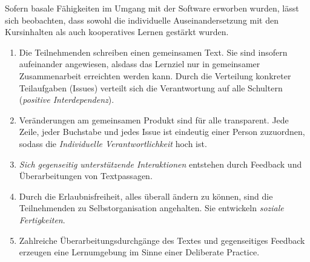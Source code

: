 \documentclass
	[
		11pt,
		a4paper,
		oneside,
		ngerman
	]
	{article}
\begin{document}
Sofern basale Fähigkeiten im Umgang mit der Software erworben wurden, lässt sich beobachten, dass sowohl die individuelle Auseinandersetzung mit den Kursinhalten als auch kooperatives Lernen \citep[vgl.][]{johnson-1999} gestärkt wurden.

\begin{enumerate}

	\item Die Teilnehmenden schreiben einen gemeinsamen Text.
	Sie sind insofern aufeinander angewiesen, alsdass das Lernziel nur in gemeinsamer Zusammenarbeit erreichten werden kann.
	Durch die Verteilung konkreter Teilaufgaben (Issues) verteilt sich die Verantwortung auf alle Schultern (\emph{positive Interdependenz}).
	\item Veränderungen am gemeinsamen Produkt sind für alle transparent.
	Jede Zeile, jeder Buchstabe und jedes Issue ist eindeutig einer Person zuzuordnen, sodass die \emph{Individuelle Verantwortlichkeit} hoch ist.
	\item \emph{Sich gegenseitig unterstützende Interaktionen} entstehen durch Feedback und Überarbeitungen von Textpassagen.
	\item Durch die Erlaubnisfreiheit, alles überall ändern zu können, sind die Teilnehmenden zu Selbstorganisation angehalten.
	Sie entwickeln \emph{soziale Fertigkeiten}.
	\citep[vgl.][]{johnson-1999}
	\item Zahlreiche Überarbeitungsdurchgänge des Textes und gegenseitiges Feedback erzeugen eine Lernumgebung im Sinne einer Deliberate Practice.

\end{enumerate}





\end{document}
